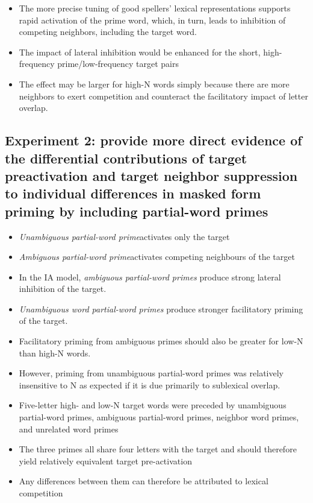 \documentclass[]{article}
\begin{document}
{\begin{itemize}
				\item The more precise tuning of good spellers’ lexical representations supports rapid activation of the prime word, which, in turn, leads to inhibition of competing neighbors, including the target word.
				\item The impact of lateral inhibition would be enhanced for the short, high-frequency prime/low-frequency target pairs
				\item The effect may be larger for high-N words simply because there are more neighbors to exert competition and counteract the facilitatory impact of letter overlap. 
			\end{itemize}
	
		\subsection{Experiment 2: provide more direct evidence of the differential contributions of target preactivation and target neighbor suppression to individual differences in masked form priming by including partial-word primes}
		\begin{itemize}
			\item \textit{Unambiguous partial-word prime}\textendash activates only the target
			\item \textit{Ambiguous partial-word prime}\textendash activates competing neighbours of the target
			\item In the IA model, \textit{ambiguous partial-word primes} produce strong lateral inhibition of the target. 
			\item \textit{Unambiguous word partial-word primes} produce stronger facilitatory priming of the target.  
			\item  Facilitatory priming from ambiguous primes should also be greater for low-N than high-N words. 
			\item However, priming from unambiguous partial-word primes was relatively insensitive to N as expected if it is due primarily to sublexical overlap.
			\item Five-letter high- and low-N target words were preceded by unambiguous partial-word primes, ambiguous partial-word primes, neighbor word primes, and unrelated word primes
			\item The three primes all share four letters with the target and should therefore yield relatively equivalent target pre-activation
			\item Any differences between them can therefore be attributed to lexical competition

\end{itemize}}
\end{document}
